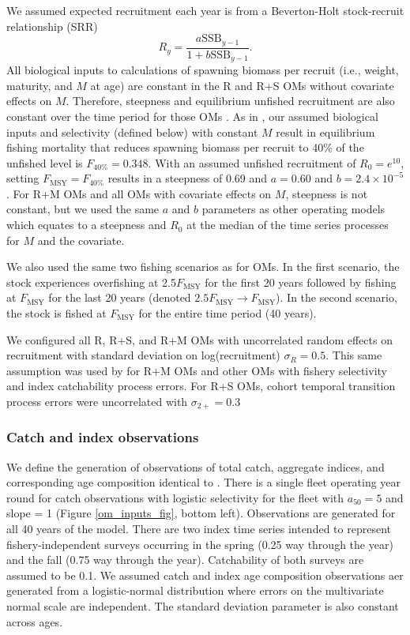 \documentclass[
  12pt,
]{article}
\newcommand{\Fmsy}{\ensuremath{F_{\text{MSY}}}\xspace}
\begin{document}
We assumed expected recruitment each year is from a Beverton-Holt stock-recruit relationship (SRR)
\[
R_{y} = \frac{a \text{SSB}_{y-1}}{1 + b \text{SSB}_{y-1}}.
\]
All biological inputs to calculations of spawning biomass per recruit (i.e., weight, maturity, and \(M\) at age) are constant in the R and R+S OMs without covariate effects on \(M\). Therefore, steepness and equilibrium unfished recruitment are also constant over the time period for those OMs \citep{millerbrooks21}. As in \citet{milleretal_inreview1}, our assumed biological inputs and selectivity (defined below) with constant \(M\) result in equilibrium fishing mortality that reduces spawning biomass per recruit to 40\% of the unfished level is \(F_{40\%} = 0.348\). With an assumed unfished recruitment of \(R_0 = e^{10}\), setting \(\Fmsy = F_{40\%}\) results in a steepness of 0.69 and \(a=0.60\) and \(b = 2.4 \times 10^{-5}\). For R+M OMs and all OMs with covariate effects on \(M\), steepness is not constant, but we used the same \(a\) and \(b\) parameters as other operating models which equates to a steepness and \(R_0\) at the median of the time series processes for \(M\) and the covariate.

We also used the same two fishing scenarios as \citet{milleretal_inreview1} for OMs. In the first scenario, the stock experiences overfishing at 2.5\Fmsy for the first 20 years followed by fishing at \Fmsy for the last 20 years (denoted \(2.5\Fmsy \rightarrow \Fmsy\)). In the second scenario, the stock is fished at \Fmsy for the entire time period (40 years).

We configured all R, R+S, and R+M OMs with uncorrelated random effects on recruitment with standard deviation on log(recruitment) \(\sigma_R = 0.5\). This same assumption was used by \citet{milleretal_inreview1} for R+M OMs and other OMs with fishery selectivity and index catchability process errors. For R+S OMs, cohort temporal transition process errors were uncorrelated with \(\sigma_{2+} = 0.3\)

\hypertarget{catch-and-index-observations}{%
\subsubsection*{Catch and index observations}\label{catch-and-index-observations}}

We define the generation of observations of total catch, aggregate indices, and corresponding age composition identical to \citet{milleretal_inreview1}. There is a single fleet operating year round for catch observations with logistic selectivity for the fleet with \(a_{50} = 5\) and slope = 1 (Figure \ref{om_inputs_fig}, bottom left). Observations are generated for all 40 years of the model. There are two index time series intended to represent fishery-independent surveys occurring in the spring (0.25 way through the year) and the fall (0.75 way through the year). Catchability of both surveys are assumed to be 0.1. We assumed catch and index age composition observations aer generated from a logistic-normal distribution where errors on the multivariate normal scale are independent. The standard deviation parameter is also constant across ages.
\end{document}
